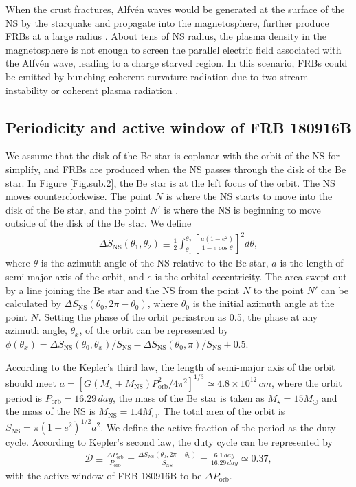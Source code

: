 \documentclass[twocolumn]{aastex62}
\begin{document}
When the crust fractures, Alfv\'en waves would be generated at the surface of the NS by the starquake and propagate into the magnetosphere, further produce FRBs at a large radius \citep{kum20, lu20, yan21}. About tens of NS radius, the plasma density in the magnetosphere is not enough to screen the parallel electric field associated with the Alfv\'en wave, leading to a charge starved region.
In this scenario, FRBs could be emitted by bunching coherent curvature radiation due to two-stream instability \citep{kum20, lu20,yan20} or coherent plasma radiation \citep{yan21}.

\subsection{Periodicity and active window of FRB 180916B}\label{sec2.2}

We assume that the disk of the Be star is coplanar with the orbit of the NS for simplify, and FRBs are produced when the NS passes through the disk of the Be star. In Figure \ref{Fig.sub.2}, the Be star is at the left focus of the orbit.
The NS moves counterclockwise.
The point $N$ is where the NS starts to move into the disk of the Be star, and the point $N'$ is where the NS is beginning to move outside of the disk of the Be star.
We define
\begin{eqnarray}
\Delta S_{\text {NS}} (\theta_1, \theta_2) \equiv \frac{1}{2}\int_{\theta_1}^{\theta_2}\left[\frac{a\left(1-e^{2}\right)}{1-e \cos \theta}\right]^{2} d \theta,
\end{eqnarray}
where $\theta$ is the azimuth angle of the NS relative to the Be star, $a$ is the length of semi-major axis of the orbit, and $e$ is the orbital eccentricity.
The area swept out by a line joining the Be star and the NS from the point $N$ to the point $N'$ can be calculated by
$\Delta S_{\text {NS}} (\theta_0, 2\pi-\theta_0)$,
where $\theta_0$ is the initial azimuth angle at the point $N$.
Setting the phase of the orbit periastron as 0.5, the phase at any azimuth angle, $\theta_x$, of the orbit can be represented by
$\phi (\theta_x) = \Delta S_{\text {NS}} (\theta_0, \theta_x)/S_{\text {NS}} - \Delta S_{\text {NS}} (\theta_0, \pi)/S_{\text {NS}} + 0.5$.

According to the Kepler's third law, the length of semi-major axis of the orbit should meet 
$a = \left[ G(M_{\star} + M_{\text{NS}})P_{\text{orb}}^2/4\pi^2 \right]^{1/3} \simeq 4.8\times 10^{12} \,\unit{cm}$,
where the orbit period is $P_{\text{orb}} = 16.29 \,\unit{day}$, the mass of the Be star is taken as $M_{\star} = 15 M_{\odot} $ and the mass of the NS is $M_{\text{NS}} = 1.4 M_{\odot} $.
The total area of the orbit is $S_{\text {NS}}=\pi\left(1-e^{2}\right)^{1 / 2} a^{2}$. 
We define the active fraction of the period as the duty cycle.
According to Kepler's second law, the duty cycle can be represented by
\begin{align}
\mathcal{D} \equiv \frac{\Delta P_{\text {orb}}}{P_{\text {orb}}} = \frac{\Delta S_{\text {NS}}(\theta_0, 2\pi-\theta_0)}{S_{\text {NS}}}=\frac{6.1\,\unit{day}}{16.29\,\unit{day}}\simeq 0.37,
\end{align}
with the active window of FRB 180916B to be $\Delta P_{\text {orb}}$.
\end{document}
